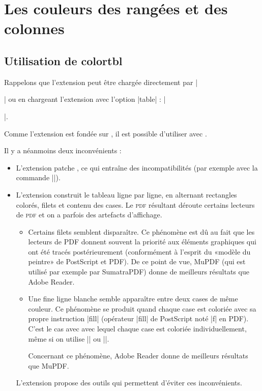 \documentclass[dvipsnames]{article}%
\begin{document}
\section{Les couleurs des rangées et des colonnes}

\subsection{Utilisation de colortbl}

Rappelons que l'extension  peut être chargée directement par
|\usepackage{colortbl}| ou en chargeant l'extension  avec l'option
|table| : |\usepackage[table]{xcolor}|.

\medskip
Comme l'extension  est fondée sur , il est possible
d'utiliser  avec .

\medskip
Il y a néanmoins deux inconvénients :
\begin{itemize}
\item L'extension  patche , ce qui entraîne des
incompatibilités (par exemple avec la commande |\hdotsfor|).

\item L'extension  construit le tableau ligne par ligne, en
alternant rectangles colorés, filets et contenu des cases. Le \textsc{pdf}
résultant déroute certains lecteurs de \textsc{pdf} et on a parfois des artefacts
d'affichage.

\begin{itemize}
\item Certains filets semblent disparaître. Ce phénomène est dû au fait que les
lecteurs de PDF donnent souvent la priorité aux éléments graphiques qui ont été
tracés postérieurement (conformément à l'esprit du «modèle du peintre» de
PostScript et PDF). De ce point de vue, MuPDF (qui est utilisé par exemple par
SumatraPDF) donne de meilleurs résultats que Adobe Reader.

\item Une fine ligne blanche semble apparaître entre deux cases de même
couleur. Ce phénomène se produit quand chaque case est coloriée avec sa
propre instruction |fill| (opérateur |fill| de PostScript noté |f| en PDF).
C'est le cas avec  avec lequel chaque case est coloriée
individuellement, même si on utilise |\columncolor| ou |\rowcolor|.

Concernant ce phénomène, Adobe Reader donne de meilleurs résultats que
MuPDF.
\end{itemize}

L'extension  propose des outils qui permettent d'éviter ces
inconvénients.
\end{itemize}
\end{document}
